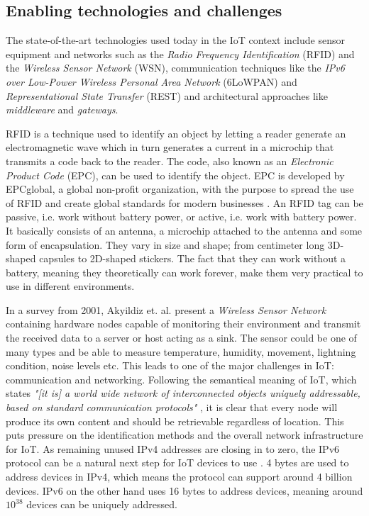 \subsection{Enabling technologies and challenges}

The state-of-the-art technologies used today in the IoT context include sensor
equipment and networks such as the \textit{Radio Frequency Identification}
(RFID) and the \textit{Wireless Sensor Network} (WSN), communication techniques
like the \textit{IPv6 over Low-Power Wireless Personal Area Network} (6LoWPAN)
and \textit{Representational State Transfer} (REST) and architectural
approaches like \textit{middleware} and \textit{gateways}.

RFID is a technique used to identify an object by letting a reader generate an
electromagnetic wave which in turn generates a current in a microchip that
transmits a code back to the reader. The code, also known as an
\textit{Electronic Product Code} (EPC), can be used to identify the object. EPC
is developed by EPCglobal, a global non-profit organization, with the purpose
to spread the use of RFID and create global standards for modern businesses
\cite{atzori2010internet}. An RFID tag can be passive, i.e. work without
battery power, or active, i.e. work with battery power. It basically consists
of an antenna, a microchip attached to the antenna and some form of
encapsulation. They vary in size and shape; from centimeter long 3D-shaped
capsules to 2D-shaped stickers. The fact that they can work without a battery,
meaning they theoretically can work forever, make them very practical to use in
different environments. \cite{want2006introduction}

In a survey from 2001, Akyildiz et. al.  \cite{akyildiz2002wireless} present a
\textit{Wireless Sensor Network} containing hardware nodes capable of
monitoring their environment and transmit the received data to a server or host
acting as a sink. The sensor could be one of many types and be able to measure
temperature, humidity, movement, lightning condition, noise levels etc. This
leads to one of the major challenges in IoT: communication and networking.
Following the semantical meaning of IoT, which states \textit{"[it is] a world
wide network of interconnected objects uniquely addressable, based on standard
communication protocols"} \cite{bassi2008internet}, it is clear that every node
will produce its own content and should be retrievable regardless of location.
This puts pressure on the identification methods and the overall network
infrastructure for IoT. As remaining unused IPv4 addresses are closing in to
zero, the IPv6 protocol can be a natural next step for IoT devices to use
\cite{atzori2010internet}. 4 bytes are used to address devices in IPv4, which
means the protocol can support around 4 billion devices. IPv6 on the other hand
uses 16 bytes to address devices, meaning around $10^{38}$ devices can be
uniquely addressed.

